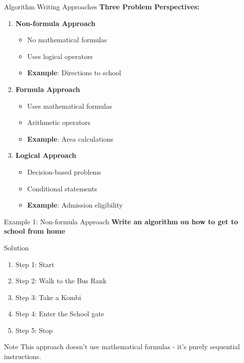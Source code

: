 \documentclass[aspectratio=169]{beamer}
\begin{document}
\begin{frame}{Algorithm Writing Approaches}
    \textbf{Three Problem Perspectives:}
    
    \begin{enumerate}
        \item \textbf{Non-formula Approach}
        \begin{itemize}
            \item No mathematical formulas
            \item Uses logical operators
            \item \textbf{Example}: Directions to school
        \end{itemize}
        
        \item \textbf{Formula Approach}
        \begin{itemize}
            \item Uses mathematical formulas
            \item Arithmetic operators
            \item \textbf{Example}: Area calculations
        \end{itemize}
        
        \item \textbf{Logical Approach}
        \begin{itemize}
            \item Decision-based problems
            \item Conditional statements
            \item \textbf{Example}: Admission eligibility
        \end{itemize}
    \end{enumerate}
\end{frame}

\begin{frame}{Example 1: Non-formula Approach}
    \textbf{Write an algorithm on how to get to school from home}
    
    \begin{exampleblock}{Solution}
        \begin{enumerate}
            \item Step 1: Start
            \item Step 2: Walk to the Bus Rank
            \item Step 3: Take a Kombi
            \item Step 4: Enter the School gate
            \item Step 5: Stop
        \end{enumerate}
    \end{exampleblock}
    
    \vspace{0.3cm}
    \begin{alertblock}{Note}
        This approach doesn't use mathematical formulas - it's purely sequential instructions.
    \end{alertblock}
\end{frame}
\end{document}
